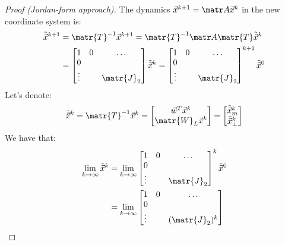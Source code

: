 \begin{theorem}
\begin{proof}[Proof (Jordan-form approach)]
        The dynamics $\x^{k+1} = \A \x^k$ in the new coordinate system is:
        \[
            \begin{split}
                \tilde{\x}^{k+1} &= \matr{T}^{-1} \x^{k+1} = \matr{T}^{-1} \A \matr{T} \tilde{\x}^k \\
                &= \begin{bmatrix}
                    1 & 0 & \dots \\
                    0 & & \\
                    \vdots & & \matr{J}_2 \\
                \end{bmatrix} \tilde{\x}^k
                = \begin{bmatrix}
                    1 & 0 & \dots \\
                    0 & & \\
                    \vdots & & \matr{J}_2 \\
                \end{bmatrix}^{k+1} \tilde{\x}^0
            \end{split}
        \]
        Let's denote:
        \[
            \tilde{\x}^k = \matr{T}^{-1}\x^k = \begin{bmatrix}
                \w^T\x^k \\ \matr{W}_L\x^k
            \end{bmatrix}
            = \begin{bmatrix}
                \tilde{\x}^k_{m} \\ \tilde{\x}^k_{\bot}
            \end{bmatrix}
        \]
        We have that:
        \[
            \begin{split}
                \lim_{k \rightarrow \infty} \tilde{\x}^k
                &= \lim_{k \rightarrow \infty} \begin{bmatrix}
                    1 & 0 & \dots \\
                    0 & & \\
                    \vdots & & \matr{J}_2 \\
                \end{bmatrix}^k \tilde{\x}^0 \\
                &= \lim_{k \rightarrow \infty} \begin{bmatrix}
                    1 & 0 & \dots \\
                    0 & & \\
                    \vdots & & (\matr{J}_2)^k \\

\end{bmatrix}
\end{split}\]
\end{proof}
\end{theorem}
